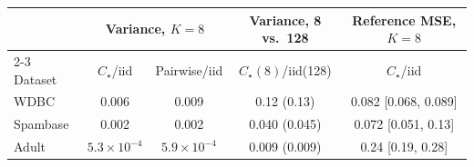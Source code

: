 \begin{tabular}{lcccc}
\toprule
 & \multicolumn{2}{c}{Variance, $K=8$} & Variance, 8 vs.\ 128 & Reference MSE, $K=8$ \\
\cmidrule(lr){2-3}
Dataset & $C_\star$/iid & Pairwise/iid & $C_\star(8)$/iid(128) & $C_\star$/iid \\
\midrule
WDBC & 0.006 & 0.009 & 0.12 (0.13) & 0.082 [0.068, 0.089] \\
Spambase & 0.002 & 0.002 & 0.040 (0.045) & 0.072 [0.051, 0.13] \\
Adult & $5.3\times10^{-4}$ & $5.9\times10^{-4}$ & 0.009 (0.009) & 0.24 [0.19, 0.28] \\
\bottomrule
\end{tabular}
